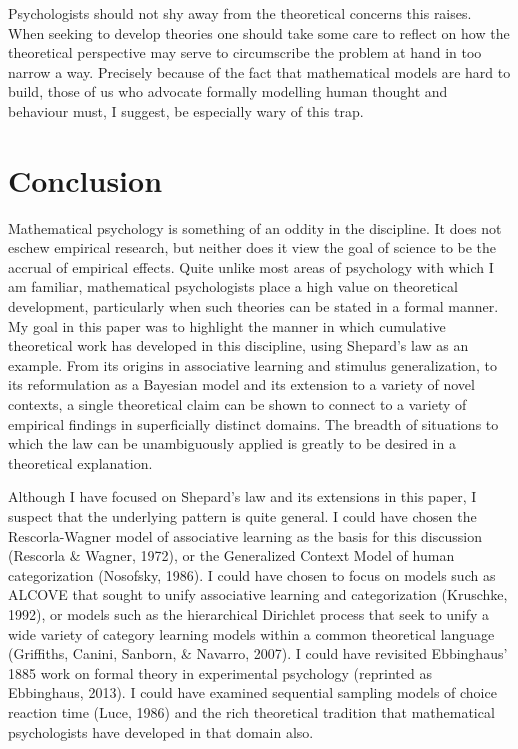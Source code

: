 \documentclass[
  english,
  doc]{apa6}
\begin{document}
\noindent
Psychologists should not shy away from the theoretical concerns this raises. When seeking to develop theories one should take some care to reflect on how the theoretical perspective may serve to circumscribe the problem at hand in too narrow a way. Precisely because of the fact that mathematical models are hard to build, those of us who advocate formally modelling human thought and behaviour must, I suggest, be especially wary of this trap.

\hypertarget{conclusion}{%
\section{Conclusion}\label{conclusion}}

\noindent
Mathematical psychology is something of an oddity in the discipline. It does not eschew empirical research, but neither does it view the goal of science to be the accrual of empirical effects. Quite unlike most areas of psychology with which I am familiar, mathematical psychologists place a high value on theoretical development, particularly when such theories can be stated in a formal manner. My goal in this paper was to highlight the manner in which cumulative theoretical work has developed in this discipline, using Shepard's law as an example. From its origins in associative learning and stimulus generalization, to its reformulation as a Bayesian model and its extension to a variety of novel contexts, a single theoretical claim can be shown to connect to a variety of empirical findings in superficially distinct domains. The breadth of situations to which the law can be unambiguously applied is greatly to be desired in a theoretical explanation.

Although I have focused on Shepard's law and its extensions in this paper, I suspect that the underlying pattern is quite general. I could have chosen the Rescorla-Wagner model of associative learning as the basis for this discussion (Rescorla \& Wagner, 1972), or the Generalized Context Model of human categorization (Nosofsky, 1986). I could have chosen to focus on models such as ALCOVE that sought to unify associative learning and categorization (Kruschke, 1992), or models such as the hierarchical Dirichlet process that seek to unify a wide variety of category learning models within a common theoretical language (Griffiths, Canini, Sanborn, \& Navarro, 2007). I could have revisited Ebbinghaus' 1885 work on formal theory in experimental psychology (reprinted as Ebbinghaus, 2013). I could have examined sequential sampling models of choice reaction time (Luce, 1986) and the rich theoretical tradition that mathematical psychologists have developed in that domain also.
\end{document}
